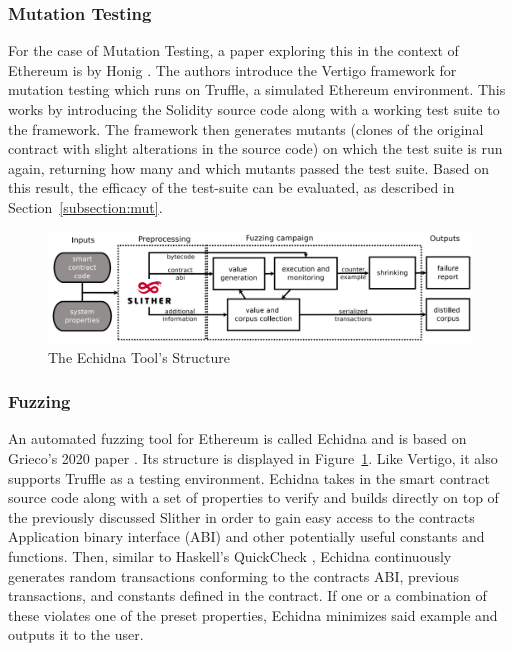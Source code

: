 \documentclass[letterpaper,twocolumn,10pt]{article}
\begin{document}
\subsubsection{Mutation Testing}

\noindent For the case of Mutation Testing, a paper exploring this in the context of Ethereum is by Honig \cite{honig_everts_huisman_2019}. The authors introduce the Vertigo framework for mutation testing which runs on Truffle, a simulated Ethereum environment. This works by introducing the Solidity source code along with a working test suite to the framework. The framework then generates mutants (clones of the original contract with slight alterations in the source code) on which the test suite is run again, returning how many and which mutants passed the test suite. Based on this result, the efficacy of the test-suite can be evaluated, as described in Section~\ref{subsection:mut}.


\begin{figure}
\begin{center}
\includegraphics[scale=0.16]{echidna}
\end{center}
\caption{\label{fig:echidna} The Echidna Tool's Structure}
\end{figure}



\subsubsection{Fuzzing}

An automated fuzzing tool for Ethereum is called Echidna and is based on Grieco's 2020 paper \cite{grieco_song_cygan_feist_groce_2020}. Its structure is displayed in Figure~\ref{fig:echidna}. Like Vertigo, it also supports Truffle as a testing environment. Echidna takes in the smart contract source code along with a set of properties to verify and builds directly on top of the previously discussed Slither in order to gain easy access to the contracts Application binary interface (ABI) and other potentially useful constants and functions. Then, similar to Haskell's QuickCheck \cite{claessen_hughes_2000}, Echidna continuously generates random transactions conforming to the contracts ABI, previous transactions, and constants defined in the contract. If one or a combination of these violates one of the preset properties, Echidna minimizes said example and outputs it to the user.
\end{document}
